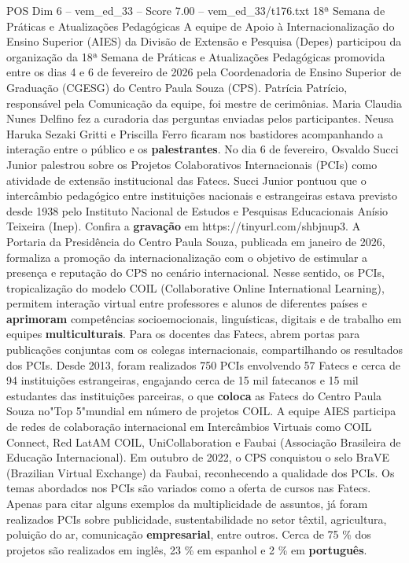 \begin{textsample}{POS Dim 6 – vem\_ed\_33 – Score 7.00 – vem\_ed\_33/t176.txt}  \label{ex:f6_pos_065}
18ª Semana de Práticas e Atualizações Pedagógicas A equipe de Apoio à Internacionalização do Ensino Superior (AIES) da Divisão de Extensão e Pesquisa (Depes) participou da organização da 18ª Semana de Práticas e Atualizações Pedagógicas promovida entre os dias 4 e 6 de fevereiro de 2026 pela Coordenadoria de Ensino Superior de Graduação (CGESG) do Centro Paula Souza (CPS).
Patrícia Patrício, responsável pela Comunicação da equipe, foi mestre de cerimônias.
Maria Claudia Nunes Delfino fez a curadoria das perguntas enviadas pelos participantes.
Neusa Haruka Sezaki Gritti e Priscilla Ferro ficaram nos bastidores acompanhando a interação entre o público e os \textbf{palestrantes}.
No dia 6 de fevereiro, Osvaldo Succi Junior palestrou sobre os Projetos Colaborativos Internacionais (PCIs) como atividade de extensão institucional das Fatecs.
Succi Junior pontuou que o intercâmbio pedagógico entre instituições nacionais e estrangeiras estava previsto desde 1938 pelo Instituto Nacional de Estudos e Pesquisas Educacionais Anísio Teixeira (Inep).
Confira a \textbf{gravação} em https://tinyurl.com/shbjnup3.
A Portaria da Presidência do Centro Paula Souza, publicada em janeiro de 2026, formaliza a promoção da internacionalização com o objetivo de estimular a presença e reputação do CPS no cenário internacional.
Nesse sentido, os PCIs, tropicalização do modelo COIL (Collaborative Online International Learning), permitem interação virtual entre professores e alunos de diferentes países e \textbf{aprimoram} competências socioemocionais, linguísticas, digitais e de trabalho em equipes \textbf{multiculturais}.
Para os docentes das Fatecs, abrem portas para publicações conjuntas com os colegas internacionais, compartilhando os resultados dos PCIs.
Desde 2013, foram realizados 750 PCIs envolvendo 57 Fatecs e cerca de 94 instituições estrangeiras, engajando cerca de 15 mil fatecanos e 15 mil estudantes das instituições parceiras, o que \textbf{coloca} as Fatecs do Centro Paula Souza no"Top 5"mundial em número de projetos COIL.
A equipe AIES participa de redes de colaboração internacional em Intercâmbios Virtuais como COIL Connect, Red LatAM COIL, UniCollaboration e Faubai (Associação Brasileira de Educação Internacional).
Em outubro de 2022, o CPS conquistou o selo BraVE (Brazilian Virtual Exchange) da Faubai, reconhecendo a qualidade dos PCIs.
Os temas abordados nos PCIs são variados como a oferta de cursos nas Fatecs.
Apenas para citar alguns exemplos da multiplicidade de assuntos, já foram realizados PCIs sobre publicidade, sustentabilidade no setor têxtil, agricultura, poluição do ar, comunicação \textbf{empresarial}, entre outros.
Cerca de 75 \% dos projetos são realizados em inglês, 23 \% em espanhol e 2 \% em \textbf{português}.

\end{textsample}
